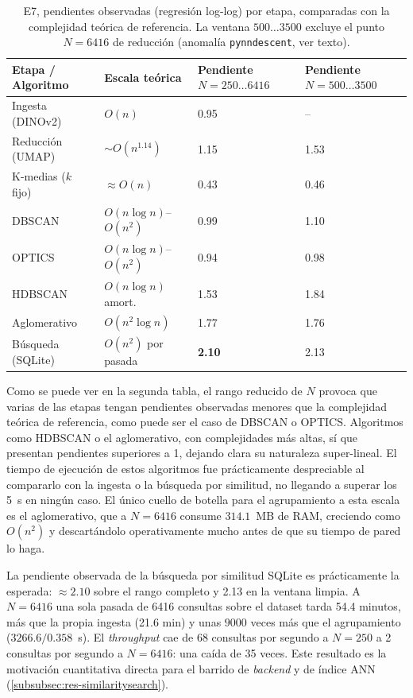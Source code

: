 \begin{table}[h]
\caption[E7, pendientes observadas por etapa]{E7, pendientes observadas (regresión log-log) por etapa, comparadas
con la complejidad teórica de referencia. La ventana $500\ldots3500$ excluye
el punto $N=6416$ de reducción (anomalía \texttt{pynndescent}, ver texto).}
\label{tab:e7-slopes}
\centering
{\footnotesize
\begin{tabular}{|p{2.3cm}|p{3.1cm}|p{2.5cm}|p{2.5cm}|} \hline
  \textbf{Etapa / Algoritmo} & \textbf{Escala teórica} & \textbf{Pendiente $N{=}250\ldots6416$} & \textbf{Pendiente $N{=}500\ldots3500$} \\ \hline
  Ingesta (DINOv2)       & $O(n)$            & 0.95 & --   \\ \hline
  Reducción (UMAP)       & $\sim O(n^{1.14})$ & 1.15 & 1.53 \\ \hline
  K-medias ($k$ fijo)      & $\approx O(n)$    & 0.43 & 0.46 \\ \hline
  DBSCAN                 & $O(n\log n)$--$O(n^2)$ & 0.99 & 1.10 \\ \hline
  OPTICS                 & $O(n\log n)$--$O(n^2)$ & 0.94 & 0.98 \\ \hline
  HDBSCAN                & $O(n\log n)$ amort. & 1.53 & 1.84 \\ \hline
  Aglomerativo           & $O(n^2 \log n)$   & 1.77 & 1.76 \\ \hline
  Búsqueda (SQLite)      & $O(n^2)$ por pasada & \textbf{2.10} & 2.13 \\ \hline
\end{tabular}
}
\end{table}

Como se puede ver en la segunda tabla, el rango reducido de $N$ provoca que
varias de las etapas tengan pendientes observadas menores que la complejidad
teórica de referencia, como puede ser el caso de DBSCAN o OPTICS. Algoritmos
como HDBSCAN o el aglomerativo, con complejidades más altas, sí que presentan
pendientes superiores a 1, dejando clara su naturaleza super-lineal. El tiempo
de ejecución de estos algoritmos fue prácticamente despreciable al compararlo
con la ingesta o la búsqueda por similitud, no llegando a superar los 5~s en
ningún caso. El único cuello de botella para el agrupamiento a esta escala es
el aglomerativo, que a $N=6416$ consume $314.1$~MB de RAM, creciendo como
$O(n^2)$ y descartándolo operativamente mucho antes de que su tiempo de pared
lo haga.

La pendiente observada de la búsqueda por similitud SQLite es prácticamente la
esperada: $\approx 2.10$ sobre el rango completo y 2.13 en la ventana limpia. A
$N=6416$ una sola pasada de 6416 consultas sobre el dataset tarda 54.4 minutos,
más que la propia ingesta (21.6 min) y unas $9000$ veces más que el
agrupamiento ($3266.6 / 0.358$~s). El \textit{throughput} cae de 68 consultas
por segundo a $N=250$ a 2 consultas por segundo a $N=6416$: una caída de
35 veces. Este resultado es la motivación cuantitativa directa para el
barrido de \textit{backend} y de índice ANN
(\ref{subsubsec:res-similaritysearch}).


